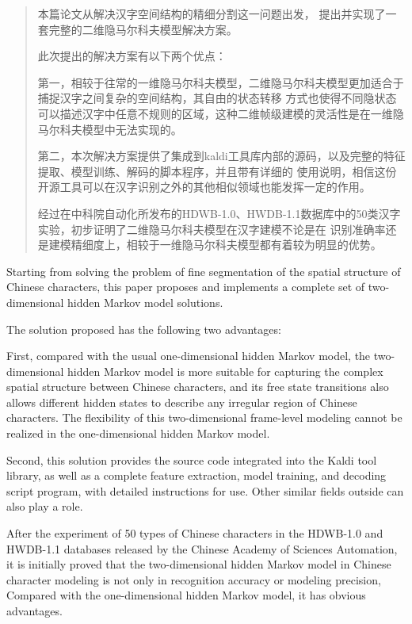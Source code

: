 

\begin{abstract}
	
	
	
	本篇论文从解决汉字空间结构的精细分割这一问题出发，
	提出并实现了一套完整的二维隐马尔科夫模型解决方案。
	
	此次提出的解决方案有以下两个优点：
	
	第一，相较于往常的一维隐马尔科夫模型，二维隐马尔科夫模型更加适合于捕捉汉字之间复杂的空间结构，其自由的状态转移
	方式也使得不同隐状态可以描述汉字中任意不规则的区域，这种二维帧级建模的灵活性是在一维隐马尔科夫模型中无法实现的。
	
	第二，本次解决方案提供了集成到kaldi工具库内部的源码，以及完整的特征提取、模型训练、解码的脚本程序，并且带有详细的
	使用说明，相信这份开源工具可以在汉字识别之外的其他相似领域也能发挥一定的作用。
	
	经过在中科院自动化所发布的HDWB-1.0、HWDB-1.1数据库中的50类汉字实验，初步证明了二维隐马尔科夫模型在汉字建模不论是在
	识别准确率还是建模精细度上，相较于一维隐马尔科夫模型都有着较为明显的优势。
	
\end{abstract}

\begin{enabstract}
	Starting from solving the problem of fine segmentation of the spatial structure of Chinese characters, 
	this paper proposes and implements a complete set of two-dimensional hidden Markov model solutions.
	
	The solution proposed has the following two advantages:
	
	First, compared with the usual one-dimensional hidden Markov model, 
	the two-dimensional hidden Markov model is more suitable for capturing the complex spatial structure between Chinese characters, 
	and its free state transitions also allows different hidden states to describe any irregular region of Chinese characters. 
	The flexibility of this two-dimensional frame-level modeling cannot be realized in the one-dimensional hidden Markov model.
	
	Second, this solution provides the source code integrated into the Kaldi tool library, 
	as well as a complete feature extraction, model training, and decoding script program,
	with detailed instructions for use. Other similar fields outside can also play a role.
	
	After the experiment of 50 types of Chinese characters in the HDWB-1.0 
	and HWDB-1.1 databases released by the Chinese Academy of Sciences Automation, 
	it is initially proved that the two-dimensional hidden Markov model in Chinese 
	character modeling is not only in recognition accuracy or modeling precision, 
	Compared with the one-dimensional hidden Markov model, it has obvious advantages.
	
\end{enabstract}
